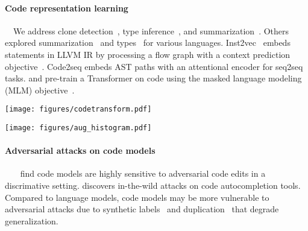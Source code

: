 \documentclass[11pt]{article}
\begin{document}
\paragraph{Code representation learning}~~We address clone detection~\cite{white2016deep}, type inference~\citep{hellendoorn2018deep}, and summarization~\cite{alon2018code2seq}.
Others explored summarization~\citep{movshovitz2013natural, allamanis2016convolutional, iyer2016summarizing, ahmad2020summarization} and types~\citep{pradel2019typewriter, p2020opttyper, Wei2020LambdaNet, allamanis2020typilus, bielik2020adversarial, allamanis2018survey} for various languages.
Inst2vec~\citep{ben2018neural} embeds statements in LLVM IR by processing a flow graph with a context prediction objective~\citep{mikolov2013distributed}.
Code2seq \citep{alon2018code2seq} embeds AST paths with an attentional encoder for seq2seq tasks.
\citet{cuBERT} and \citet{feng2020codebert} pre-train a Transformer on code using the masked language modeling (MLM) objective~\citep{devlin2018bert, taylor1953cloze}.

\begin{figure*}[t]
\centering
\begin{minipage}{.69\linewidth}
  \centering
  \texttt{[image: figures/codetransform.pdf]}
    \label{fig:augmentation_examples}
\end{minipage}\hfill \begin{minipage}{.29\linewidth}
  \centering
  \texttt{[image: figures/aug\_histogram.pdf]}
  \label{fig:augmentation_histogram}
\end{minipage}
\end{figure*} 
\paragraph{Adversarial attacks on code models}~~~\citet{yefet2019adversarial} find code models are highly sensitive to adversarial code edits in a discrimative setting. \citet{schuster1997bidirectional} discovers in-the-wild attacks on code autocompletion tools.
Compared to language models, code models may be more vulnerable to adversarial attacks due to synthetic labels~\citep{ferenc2018public,pradel2018deepbugs,benton2019defexts} and duplication~\citep{10.1145/3359591.3359735} that degrade generalization. 
\end{document}
